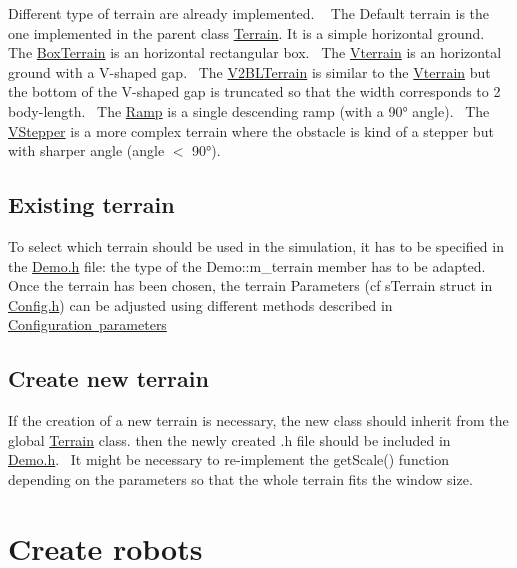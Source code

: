 Different type of terrain are already implemented. ~\newline
 The Default terrain is the one implemented in the parent class \mbox{\hyperlink{class_terrain}{Terrain}}. It is a simple horizontal ground.~\newline
 The \mbox{\hyperlink{class_box_terrain}{Box\+Terrain}} is an horizontal rectangular box.~\newline
 The \mbox{\hyperlink{class_vterrain}{Vterrain}} is an horizontal ground with a V-\/shaped gap.~\newline
 The \mbox{\hyperlink{class_v2_b_l_terrain}{V2\+B\+L\+Terrain}} is similar to the \mbox{\hyperlink{class_vterrain}{Vterrain}} but the bottom of the V-\/shaped gap is truncated so that the width corresponds to 2 body-\/length.~\newline
 The \mbox{\hyperlink{class_ramp}{Ramp}} is a single descending ramp (with a 90° angle).~\newline
 The \mbox{\hyperlink{class_v_stepper}{V\+Stepper}} is a more complex terrain where the obstacle is kind of a stepper but with sharper angle (angle $<$ 90°).~\newline
 \hypertarget{index_ex_terrain}{}\subsection{Existing terrain}\label{index_ex_terrain}
To select which terrain should be used in the simulation, it has to be specified in the \mbox{\hyperlink{_demo_8h}{Demo.\+h}} file\+: the type of the Demo\+::m\+\_\+terrain member has to be adapted. Once the terrain has been chosen, the terrain Parameters (cf s\+Terrain struct in \mbox{\hyperlink{_config_8h}{Config.\+h}}) can be adjusted using different methods described in \mbox{\hyperlink{index_param}{Configuration parameters}}\hypertarget{index_new_terrain}{}\subsection{Create new terrain}\label{index_new_terrain}
If the creation of a new terrain is necessary, the new class should inherit from the global \mbox{\hyperlink{class_terrain}{Terrain}} class. then the newly created .h file should be included in \mbox{\hyperlink{_demo_8h}{Demo.\+h}}.~\newline
 It might be necessary to re-\/implement the get\+Scale() function depending on the parameters so that the whole terrain fits the window size.~\newline
\hypertarget{index_rob}{}\section{Create robots}\label{index_rob}
